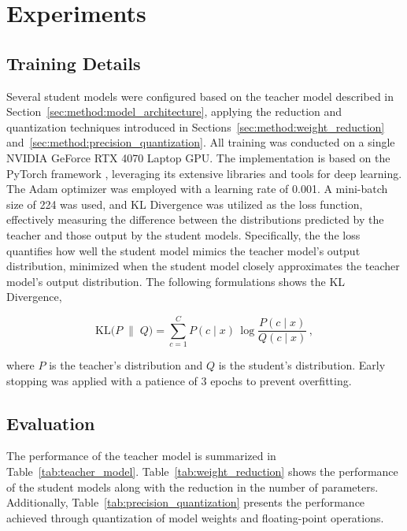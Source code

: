 \section{Experiments}

\subsection{Training Details}

Several student models were configured based on the teacher model described in Section~\ref{sec:method:model_architecture},
applying the reduction and quantization techniques
introduced in Sections~\ref{sec:method:weight_reduction} and~\ref{sec:method:precision_quantization}.
All training was conducted on a single NVIDIA GeForce RTX 4070 Laptop GPU.
The implementation is based on the PyTorch framework \cite{paszke2019pytorch},
leveraging its extensive libraries and tools for deep learning.
The Adam optimizer \cite{kingma2014adam} was employed with a learning rate of 0.001.
A mini-batch size of 224 was used, and KL Divergence was utilized as the loss function,
effectively measuring the difference
between the distributions predicted by the teacher and those output by the student models.
Specifically, the the loss quantifies how well the student model mimics the teacher model's output distribution,
minimized when the student model closely approximates the teacher model's output distribution.
The following formulations shows the KL Divergence,

\begin{equation}
    \mathrm{KL}\bigl(P\;\|\;Q\bigr)
    = \sum_{c=1}^{C} P(c\!\mid\!x)\,
        \log\frac{P(c\!\mid\!x)}
                 {Q(c\!\mid\!x)}\,,
\label{eq:kl_divergence}
\end{equation}

where $P$ is the teacher's distribution and $Q$ is the student's distribution. Early stopping was applied with a patience of 3 epochs to prevent overfitting.


\subsection{Evaluation}

The performance of the teacher model is summarized in Table~\ref{tab:teacher_model}.
Table~\ref{tab:weight_reduction} shows the performance of the student models
along with the reduction in the number of parameters.
Additionally, Table~\ref{tab:precision_quantization} presents the performance
achieved through quantization of model weights and floating-point operations.

